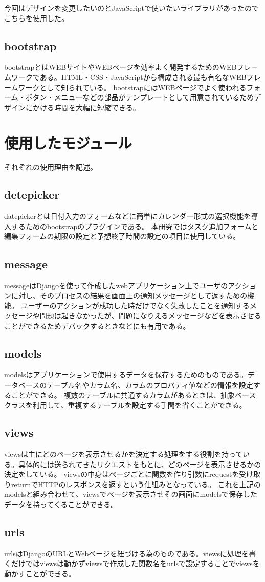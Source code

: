 今回はデザインを変更したいのとJavaScriptで使いたいライブラリがあったのでこちらを使用した。

\newpage
\subsection{bootstrap}
bootstrapとはWEBサイトやWEBページを効率よく開発するためのWEBフレームワークである。HTML・CSS・JavaScriptから構成される最も有名なWEBフレームワークとして知られている。
bootstrapにはWEBページでよく使われるフォーム・ボタン・メニューなどの部品がテンプレートとして用意されているためデザインにかける時間を大幅に短縮できる。
\section{使用したモジュール}
それぞれの使用理由を記述。

\subsection{detepicker}
datepickerとは日付入力のフォームなどに簡単にカレンダー形式の選択機能を導入するためのbootstrapのプラグインである。
本研究ではタスク追加フォームと編集フォームの期限の設定と予想終了時間の設定の項目に使用している。

\subsection{message}
messageはDjangoを使って作成したwebアプリケーション上でユーザのアクションに対し、そのプロセスの結果を画面上の通知メッセージとして返すための機能。
ユーザーのアクションが成功した時だけでなく失敗したことを通知するメッセージや問題は起きなかったが、問題になりえるメッセージなどを表示させることができるためデバックするときなどにも有用である。

\subsection{models}
modelsはアプリケーションで使用するデータを保存するためのものである。データベースのテーブル名やカラム名、カラムのプロパティ値などの情報を設定することができる。
複数のテーブルに共通するカラムがあるときは、抽象ベースクラスを利用して、重複するテーブルを設定する手間を省くことができる。

\subsection{views}
viewsは主にどのページを表示させるかを決定する処理をする役割を持っている。具体的には送られてきたリクエストをもとに、どのページを表示させるかの決定をしている。
viewsの中身はページごとに関数を作り引数にrequestを受け取りreturnでHTTPのレスポンスを返すという仕組みとなっている。
これを上記のmodelsと組み合わせて、viewsでページを表示させその画面にmodelsで保存したデータを持ってくることができる。

\subsection{urls}
urlsはDjangoのURLとWebページを紐づける為のものである。viewsに処理を書くだけではviewsは動かずviewsで作成した関数名をurlsで設定することでviewsを動かすことができる。